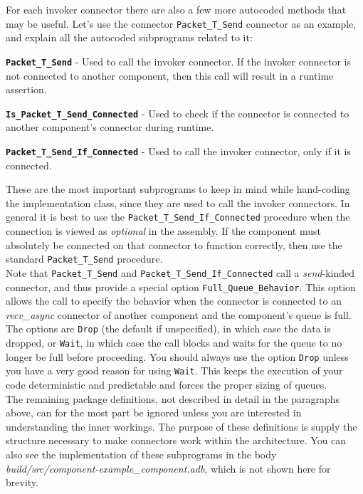 For each invoker connector there are also a few more autocoded methods that may be useful. Let's use the connector \texttt{Packet\_T\_Send} connector as an example, and explain all the autocoded subprograms related to it:

\vspace{5mm} %
\begin{spaceditemize}
  \item \textbf{\texttt{Packet\_T\_Send}} - Used to call the invoker connector. If the invoker connector is not connected to another component, then this call will result in a runtime assertion.
  \item \textbf{\texttt{Is\_Packet\_T\_Send\_Connected}} - Used to check if the connector is connected to another component's connector during runtime.
  \item \textbf{\texttt{Packet\_T\_Send\_If\_Connected}} - Used to call the invoker connector, only if it is connected.
\end{spaceditemize}
\vspace{5mm} %

These are the most important subprograms to keep in mind while hand-coding the implementation class, since they are used to call the invoker connectors. In general it is best to use the \texttt{Packet\_T\_Send\_If\_Connected} procedure when the connection is viewed as \textit{optional} in the assembly. If the component must absolutely be connected on that connector to function correctly, then use the standard \texttt{Packet\_T\_Send} procedure. \\

Note that \texttt{Packet\_T\_Send} and \texttt{Packet\_T\_Send\_If\_Connected} call a \textit{send}-kinded connector, and thus provide a special option \texttt{Full\_Queue\_Behavior}. This option allows the call to specify the behavior when the connector is connected to an \textit{recv\_async} connector of another component and the component's queue is full. The options are \texttt{Drop} (the default if unspecified), in which case the data is dropped, or \texttt{Wait}, in which case the call blocks and waits for the queue to no longer be full before proceeding. You should always use the option \texttt{Drop} unless you have a very good reason for using \texttt{Wait}. This keeps the execution of your code deterministic and predictable and forces the proper sizing of queues. \\

The remaining package definitions, not described in detail in the paragraphs above, can for the most part be ignored unless you are interested in understanding the inner workings. The purpose of these definitions is supply the structure necessary to make connectors work within the architecture. You can also see the implementation of these subprograms in the body \textit{build/src/component-example\_component.adb}, which is not shown here for brevity.

